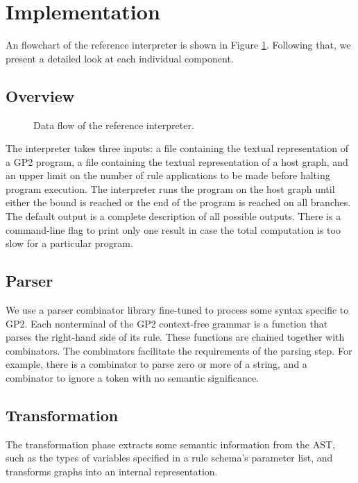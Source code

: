 \section{Implementation}

An flowchart of the reference interpreter is shown in Figure \ref{fig:architecture}. Following that, we present a detailed look at each individual component.

\subsection{Overview}

\begin{figure}
\centering

\caption{Data flow of the reference interpreter.} \label{fig:architecture}
\end{figure}

The interpreter takes three inputs: a file containing the textual representation of a GP2 program, a file containing the textual representation of a host graph, and an upper limit on the number of rule applications to be made before halting program execution. The interpreter runs the program on the host graph until either the bound is reached or the end of the program is reached on all branches. The default output is a complete description of all possible outputs. There is a command-line flag to print only one result in case the total computation is too slow for a particular program.

\subsection{Parser}

We use a parser combinator library fine-tuned to process some syntax specific to GP2. Each nonterminal of the GP2 context-free grammar is a function that parses the right-hand side of its rule. These functions are chained together with combinators. The combinators facilitate the requirements of the parsing step. For example, there is a combinator to parse zero or more of a string, and a combinator to ignore a token with no semantic significance. 

\subsection{Transformation}

The transformation phase extracts some semantic information from the AST, such as the types of variables specified in a rule schema's parameter list, and transforms graphs into an internal representation.

